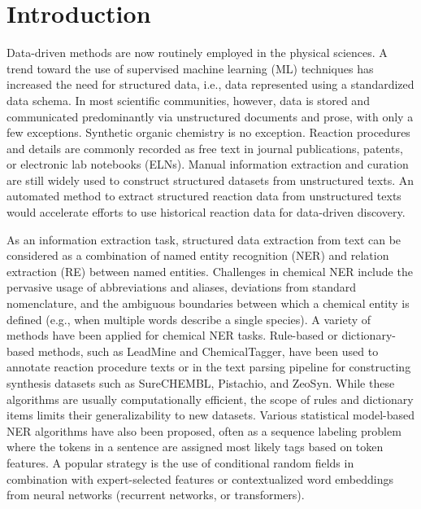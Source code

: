 \documentclass[11pt]{article}
\begin{document}
    \section{Introduction}

    Data-driven methods are now routinely employed in the physical sciences. A trend toward the use of supervised machine learning (ML) techniques has increased the need for structured data, i.e., data represented using a standardized data schema. In most scientific communities, however, data is stored and communicated predominantly via unstructured documents and prose, with only a few exceptions.\cite{mercado_data_2023} Synthetic organic chemistry is no exception. Reaction procedures and details are commonly recorded as free text in journal publications, patents, or electronic lab notebooks (ELNs). Manual information extraction and curation are still widely used to construct structured datasets from unstructured texts.\cite{gabrielson_scifinder_2018, lawson_making_2014} An automated method to extract structured reaction data from unstructured texts would accelerate efforts to use historical reaction data for data-driven discovery.

    As an information extraction task, structured data extraction from text can be considered as a combination of named entity recognition (NER) and relation extraction (RE) between named entities. Challenges in chemical NER include the pervasive usage of abbreviations and aliases, deviations from standard nomenclature, and the ambiguous boundaries between which a chemical entity is defined (e.g., when multiple words describe a single species).\cite{krallinger_chemdner_2015, krallinger_information_2017} A variety of methods have been applied for chemical NER tasks. Rule-based or dictionary-based methods, such as LeadMine\cite{lowe_leadmine_2015} and ChemicalTagger\cite{hawizy_chemicaltagger_2011}, have been used to annotate reaction procedure texts or in the text parsing pipeline for constructing synthesis datasets such as SureCHEMBL\cite{papadatos_surechembl_2016}, Pistachio\cite{noauthor_nextmove_nodate}, and ZeoSyn\cite{pan_zeosyn_2024}. While these algorithms are usually computationally efficient, the scope of rules and dictionary items limits their generalizability to new datasets. Various statistical model-based NER algorithms have also been proposed, often as a sequence labeling problem where the tokens in a sentence are assigned most likely tags based on token features. A popular strategy is the use of conditional random fields\cite{lafferty_conditional_2001} in combination with expert-selected features\cite{rocktaschel_chemspot_2012} or contextualized word embeddings from neural networks (recurrent networks\cite{luo_attention-based_2018, hemati_lstmvoter_2019, zhai_improving_2019},  or transformers\cite{guo_automated_2022, isazawa_single_2022, almeida_chemical_2022,trewartha_quantifying_2022}).
\end{document}
